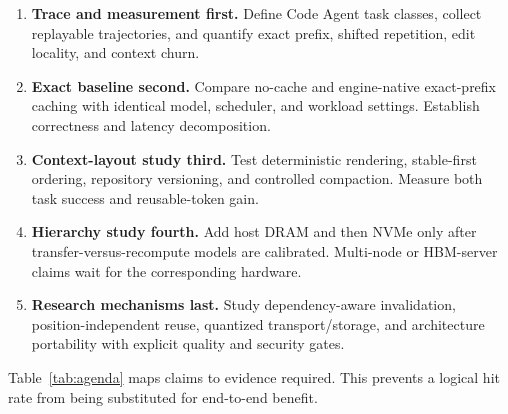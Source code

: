 \documentclass[conference,10pt]{IEEEtran}
\begin{document}
\begin{enumerate}
    \item \textbf{Trace and measurement first.} Define Code Agent task classes, collect replayable trajectories, and quantify exact prefix, shifted repetition, edit locality, and context churn.
    \item \textbf{Exact baseline second.} Compare no-cache and engine-native exact-prefix caching with identical model, scheduler, and workload settings. Establish correctness and latency decomposition.
    \item \textbf{Context-layout study third.} Test deterministic rendering, stable-first ordering, repository versioning, and controlled compaction. Measure both task success and reusable-token gain.
    \item \textbf{Hierarchy study fourth.} Add host DRAM and then NVMe only after transfer-versus-recompute models are calibrated. Multi-node or HBM-server claims wait for the corresponding hardware.
    \item \textbf{Research mechanisms last.} Study dependency-aware invalidation, position-independent reuse, quantized transport/storage, and architecture portability with explicit quality and security gates.
\end{enumerate}

Table~\ref{tab:agenda} maps claims to evidence required. This prevents a logical hit rate from being substituted for end-to-end benefit.
\end{document}
